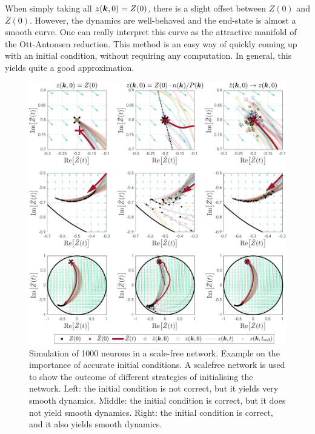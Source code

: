 
 
When simply taking all $z({\boldsymbol{k}}, 0) = Z(0)$, there is a slight offset between $Z(0)$ and $\bar{Z}(0)$. However, the dynamics are well-behaved and the end-state is almost a smooth curve. One can really interpret this curve as the attractive manifold of the Ott-Antonsen reduction. This method is an easy way of quickly coming up with an initial condition, without requiring any computation. In general, this yields quite a good approximation. \\

\begin{figure}[H]
\centering
\includegraphics[width = \textwidth]{../Figures/PhaseSpace/Mappings.pdf}
   \caption{Simulation of 1000 neurons in a scale-free network. Example on the importance of accurate initial conditions. A scalefree network is used to show the outcome of different strategies of initialising the network. Left: the initial condition is not correct, but it yields very smooth dynamics. Middle: the initial condition is correct, but it does not yield smooth dynamics. Right: the initial condition is correct, and it also yields smooth dynamics.}
   \label{fig:mappings}
\end{figure}

